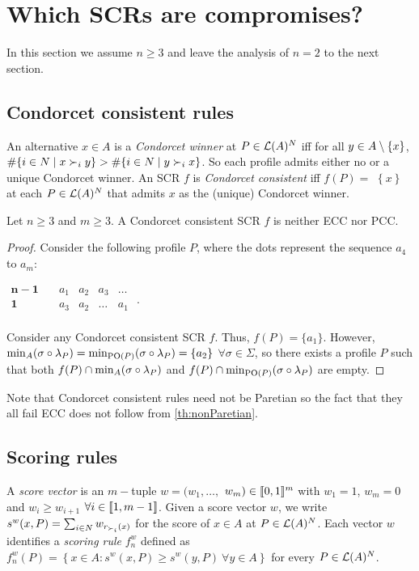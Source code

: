 \section{Which \acp{SCR} are compromises?}
\label{sec:more2voters}
In this section we assume $n\geq 3$ and leave the analysis of $n=2$ to the
next section.

\subsection{Condorcet consistent rules}

An alternative $x\in A$ is a \emph{Condorcet winner} at $P\in \mathcal{L}(A)^N$ iff for all $y\in A \setminus \{x\} $, $\#\set{i \in N \suchthat x \prefi y} >\#\set{i \in N \suchthat y \prefi x}$. So each profile admits
either no or a unique Condorcet winner. An \ac{SCR} $f$ is \emph{Condorcet
	consistent} iff $f(P)=$ $\left\{ x\right\} $ at each $P\in \mathcal{L}(A)^N$ that
admits $x$ as the (unique) Condorcet winner.

\begin{theorem} \label{th:condorcet}
	Let $n\geq 3$ and $m\geq 3$. A Condorcet consistent \ac{SCR} $f$ is neither ECC nor PCC.
\end{theorem}
\begin{proof}
	Consider the following profile $P$, where the dots represent the sequence $a_4$ to $a_m$:
	\begin{center}
		$
		\begin{array}{cccccc}
			\mathbf{n-1} \quad &a_1&a_2&a_3&\dots\\
			\mathbf{1} \quad &a_3&a_2&\dots&a_1\\
		\end{array}
		$ \quad.
	\end{center}
	
	Consider any Condorcet consistent \ac{SCR} $f$. Thus, $f(P)=\{a_1\}$. However, $\musigma=\mustar=\{a_2\}$ $\forall \sigma \in \Sigma$, so there exists a profile $P$ such that both $f(P)\cap \musigma$ and $f(P)\cap \mustar$ are empty.
\end{proof}

Note that Condorcet consistent rules need not be Paretian so the fact that they all fail ECC does not follow from \cref{th:nonParetian}. 

\subsection{Scoring rules}
\label{sec:scoringrules}
A \emph{score vector} is an $m-$tuple $w=(w_{1},\dots,$ $w_{m})\in \llbracket0, 1\rrbracket^{m}$ with $w_{1}=1$, $w_{m}=0$ and $w_{i}\geq w_{i+1}$ $\forall i\in \llbracket1, m-1\rrbracket$. Given a score vector $w$, we write $s^{w}(x,P)=\sum_{i\in N}w_{r_{\prefi}(x)}$ for the score of $x\in A$ at $P \in \mathcal{L}(A)^N$. Each vector $w$ identifies a \emph{scoring rule} $f^w_n$ defined as $f^w_n(P)=\left\{ x\in A:s^{w}(x,P)\geq s^{w}(y,P) \ \forall y\in A\right\}$ for every $P \in \mathcal{L}(A)^N$.

